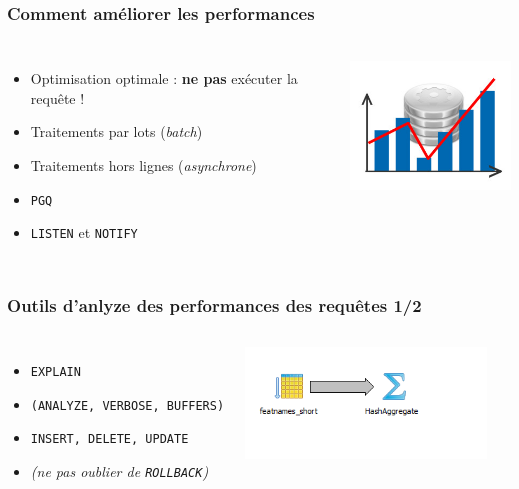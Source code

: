 \documentclass{beamer}
\begin{document}
\begin{frame}
  \frametitle{Comment améliorer les performances}

  \vfill

\begin{columns}[c]

\begin{itemize}
  \item Optimisation optimale : \textbf{ne pas} exécuter la requête !
  \item Traitements par lots (\textit{batch})
  \item Traitements hors lignes (\textit{asynchrone})
  \item \texttt{PGQ}
  \item \texttt{LISTEN} et \texttt{NOTIFY}
\end{itemize}

\begin{center}
  \includegraphics[height=10em]{optimisation.jpg}
\end{center}
\end{columns}
\end{frame}

\begin{frame}
  \frametitle{Outils d'anlyze des performances des requêtes 1/2}

  \vfill

\begin{columns}[c]

\begin{itemize}
  \item \texttt{EXPLAIN}
  \item \texttt{(ANALYZE, VERBOSE, BUFFERS)}
  \item \texttt{INSERT, DELETE, UPDATE}
  \item \textit{(ne pas oublier de \texttt{ROLLBACK})}
\end{itemize}

\begin{center}
  \includegraphics[height=8em]{pg91_btree_explain_like2.png}
\end{center}
\end{columns}
\end{frame}
\end{document}
